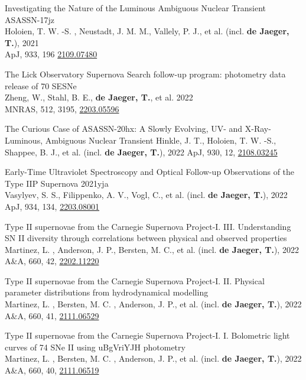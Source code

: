 \documentclass[12pt]{article}
\begin{document}
\begin{bibenum}
    \item 
Investigating the Nature of the Luminous Ambiguous Nuclear Transient ASASSN-17jz\\
Holoien, T. W. -S. , Neustadt, J. M. M., Vallely, P. J., et al. (incl. \textbf{de Jaeger, T.}), 2021 \\
ApJ, 933, 196 \href{https://arxiv.org/abs/2109.07480}{2109.07480}

    \item 
The Lick Observatory Supernova Search follow-up program: photometry data release of 70 SESNe\\
Zheng, W., Stahl, B. E., \textbf{de Jaeger, T.}, et al. 2022\\
MNRAS, 512, 3195, \href{https://arxiv.org/abs/2203.05596}{2203.05596} 

    \item
The Curious Case of ASASSN-20hx: A Slowly Evolving, UV- and X-Ray-Luminous, Ambiguous Nuclear Transient
Hinkle, J. T., Holoien, T. W. -S., Shappee, B. J., et al. (incl. \textbf{de Jaeger, T.}), 2022 
ApJ, 930, 12, \href{https://arxiv.org/abs/2108.03245}{2108.03245}

    \item 
Early-Time Ultraviolet Spectroscopy and Optical Follow-up Observations of the Type IIP Supernova 2021yja \\
Vasylyev, S. S., Filippenko, A. V., Vogl, C., et al. (incl. \textbf{de Jaeger, T.}), 2022 \\
ApJ, 934, 134, \href{https://arxiv.org/abs/2203.08001}{2203.08001}

\item 
Type II supernovae from the Carnegie Supernova Project-I. III. Understanding SN II diversity through correlations between physical and observed properties\\
Martinez, L. , Anderson, J. P., Bersten, M. C., et al. (incl. \textbf{de Jaeger, T.}), 2022 \\
A\&A, 660, 42, \href{https://arxiv.org/abs/2202.11220 }{2202.11220 }

\item 
Type II supernovae from the Carnegie Supernova Project-I. II. Physical parameter distributions from hydrodynamical modelling\\
Martinez, L. , Bersten, M. C. , Anderson, J. P., et al. (incl. \textbf{de Jaeger, T.}), 2022 \\
A\&A, 660, 41, \href{https://arxiv.org/abs/2111.06529}{2111.06529}

\item 
Type II supernovae from the Carnegie Supernova Project-I. I. Bolometric light curves of 74 SNe II using uBgVriYJH photometry\\
Martinez, L. , Bersten, M. C. , Anderson, J. P., et al. (incl. \textbf{de Jaeger, T.}), 2022 \\
A\&A, 660, 40, \href{https://arxiv.org/abs/2111.06519}{2111.06519}


\end{bibenum}
\end{document}
